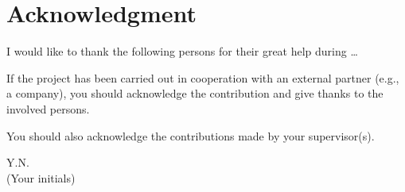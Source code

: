 \section*{Acknowledgment}
I would like to thank the following persons for their great help during \ldots

If the project has been carried out in cooperation with an external partner (e.g., a company), you should acknowledge the contribution and give thanks to the involved persons.

You should also acknowledge the contributions made by your supervisor(s).

\begin{flushright}
Y.N.\\[1pc]
(Your initials)
\end{flushright}